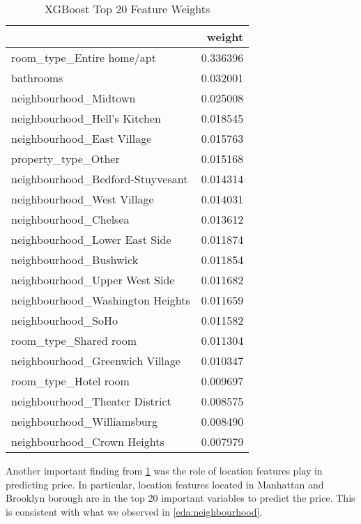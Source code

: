 \begin{table}[H]
  \centering
  \caption{XGBoost Top 20 Feature Weights}
  \label{tab:xgb-weights}
  \begin{tabular}{lr}
    \toprule
    {} &    weight \\
    \midrule
    room\_type\_Entire home/apt        &  0.336396 \\
    bathrooms                        &  0.032001 \\
    neighbourhood\_Midtown            &  0.025008 \\
    neighbourhood\_Hell's Kitchen     &  0.018545 \\
    neighbourhood\_East Village       &  0.015763 \\
    property\_type\_Other              &  0.015168 \\
    neighbourhood\_Bedford-Stuyvesant &  0.014314 \\
    neighbourhood\_West Village       &  0.014031 \\
    neighbourhood\_Chelsea            &  0.013612 \\
    neighbourhood\_Lower East Side    &  0.011874 \\
    neighbourhood\_Bushwick           &  0.011854 \\
    neighbourhood\_Upper West Side    &  0.011682 \\
    neighbourhood\_Washington Heights &  0.011659 \\
    neighbourhood\_SoHo               &  0.011582 \\
    room\_type\_Shared room            &  0.011304 \\
    neighbourhood\_Greenwich Village  &  0.010347 \\
    room\_type\_Hotel room             &  0.009697 \\
    neighbourhood\_Theater District   &  0.008575 \\
    neighbourhood\_Williamsburg       &  0.008490 \\
    neighbourhood\_Crown Heights      &  0.007979 \\
  \bottomrule
  \end{tabular}
\end{table}

Another important finding from \ref{tab:xgb-weights} was the role of location
features play in predicting price. In particular, location features located in
Manhattan and Brooklyn borough are in the top 20 important variables to predict
the price. This is consistent with what we observed in \ref{eda:neighbourhood}.
